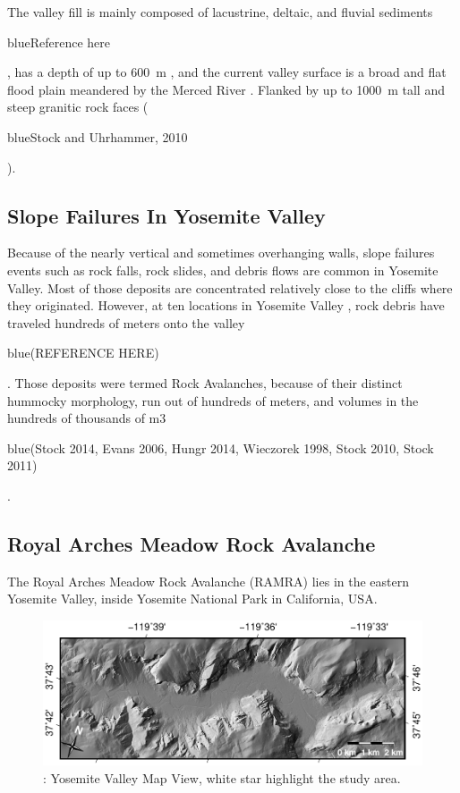 \documentclass[5p]{elsarticle}
\newcommand{\COMON}{\begin{color}{blue}}
\newcommand{\COMOFF}{\end{color}}
\begin{document}
The valley fill is mainly composed of lacustrine, deltaic, and fluvial sediments \COMON Reference here\COMOFF, has a depth of up to \SI{600}{m} \cite{gutenberg1956seismic}, and the current valley surface is a broad and flat flood plain meandered by the Merced River \cite{Wieczorek+1996}. Flanked by up to \SI{1000}{m} tall and steep granitic rock faces (\COMON Stock and Uhrhammer, 2010 \COMOFF).
    
    
    
\subsection{Slope Failures In Yosemite Valley}

Because of  the nearly vertical and sometimes overhanging walls, slope failures events such as rock falls, rock slides, and debris flows are common in Yosemite Valley. Most of those deposits are concentrated relatively close to the cliffs where they originated. However, at ten locations in Yosemite Valley , rock debris have traveled hundreds of meters onto the valley \COMON(REFERENCE HERE)\COMOFF. Those deposits were termed Rock Avalanches, because of their distinct hummocky morphology, run out of hundreds of meters, and volumes in the hundreds of thousands of m3 \COMON(Stock 2014, Evans 2006,  Hungr 2014, Wieczorek 1998, Stock 2010, Stock 2011)\COMOFF. 


\subsection{Royal Arches Meadow Rock Avalanche}\label{sec:introRAMRA}

The Royal Arches Meadow Rock Avalanche (RAMRA) lies in the eastern Yosemite Valley, inside Yosemite National Park in California, USA.


								   \begin{figure}[h]

	\includegraphics[width=\textwidth]{Yosemite.pdf}
		\caption{: Yosemite Valley Map View, white star highlight the study area.  \label{Study_Area}}

								   \end{figure}
\end{document}
